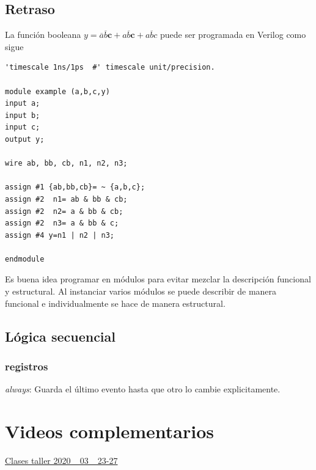 \documentclass[12pt,letterpaper]{book}
\begin{document}
\section{Retraso}

La función booleana $y=\overline{a}\overline{b}\textbf{c}+a\overline{b}\textbf{c}+a\overline{b}c$ puede ser programada en Verilog como sigue \cite[Pág. 183]{Harris}

\begin{lstlisting}[frame=single]
'timescale 1ns/1ps  #' timescale unit/precision.  

module example (a,b,c,y)
input a;
input b;
input c;
output y;

wire ab, bb, cb, n1, n2, n3;

assign #1 {ab,bb,cb}= ~ {a,b,c};
assign #2  n1= ab & bb & cb;
assign #2  n2= a & bb & cb;
assign #2  n3= a & bb & c;
assign #4 y=n1 | n2 | n3;

endmodule

\end{lstlisting}

Es buena idea programar en módulos para evitar mezclar la descripción funcional y estructural. Al instanciar varios módulos se puede describir de manera funcional e individualmente se hace de manera estructural. 


\section{Lógica secuencial}
\subsection{registros}

\textit{always}: Guarda el último evento hasta que otro lo cambie explicitamente.


\chapter{Videos complementarios}

\href{https://www.youtube.com/watch?v=ypz23yWrwf0&feature=youtu.be}{Clases taller 2020\_ 03\_ 23-27 }\\












 
\end{document}
